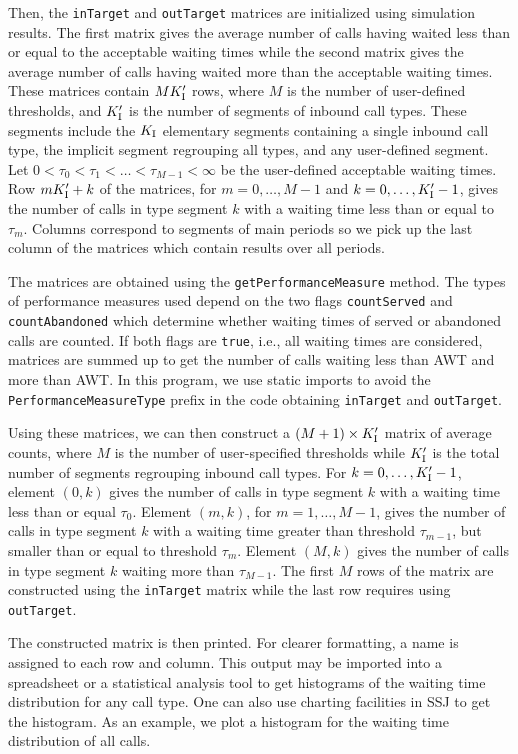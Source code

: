 Then, the \texttt{in\-Target} and \texttt{out\-Target} matrices are
initialized using simulation results.
The first matrix gives the average number of calls having waited less
than or equal to the acceptable waiting times while the
second matrix gives the average number of calls having waited
more than the acceptable waiting times.
These matrices contain $MK_{\mathrm{I}}'$ rows, where $M$ is the number of
user-defined
thresholds, and $K_{\mathrm{I}}'$ is the number of segments of inbound call
types.
These segments include the $K_{\mathrm{I}}$ elementary segments containing a
single inbound call type,
the implicit segment regrouping all types, and any
user-defined segment.
Let $0<\tau_0<\tau_1<\ldots<\tau_{M-1}<\infty$ be the
user-defined acceptable waiting times.
Row $mK_{\mathrm{I}}' + k$ of the matrices,
for $m=0,\ldots,M-1$ and $k=0,\ldots,K_{\mathrm{I}}'-1$,
gives the number of calls
in type segment $k$ with a waiting time less than or equal to
$\tau_m$.
Columns correspond to segments of main periods
so we pick up the last column of the matrices which contain
results over all periods.

The matrices are obtained using
the \texttt{get\-Performance\-Measure} method.
The types of performance measures used
depend on
the two flags
\texttt{count\-Served} and \texttt{count\-Abandoned} which
determine whether waiting times of served or abandoned calls
are counted.
If both flags are \texttt{true}, i.e., all waiting times are
considered,
matrices are summed up to get the number of calls waiting less than
AWT and more than AWT.
In this program, we use static imports to avoid the
\texttt{Performance\-Measure\-Type} prefix in the code obtaining
\texttt{in\-Target} and \texttt{out\-Target}.

Using these matrices, we can then construct a
$(M+1)\times K_{\mathrm{I}}'$ matrix of average counts, where $M$
is the number of user-specified thresholds while
$K_{\mathrm{I}}'$ is the total number of segments regrouping inbound call types.
For $k=0,\ldots,K_{\mathrm{I}}'-1$,
element $(0, k)$ gives the number of calls
in type segment $k$ with a waiting time less than or equal $\tau_0$.
Element $(m, k)$, for $m=1,\ldots,M-1$,
gives the number of calls in type segment
$k$ with a waiting time greater than threshold
$\tau_{m-1}$, but smaller than or equal to threshold $\tau_m$.
Element $(M,k)$ gives the number of calls in type segment $k$
waiting more than $\tau_{M-1}$.
The first $M$ rows of the matrix are constructed using the
\texttt{in\-Target} matrix while the last
row requires using \texttt{out\-Target}.

The constructed matrix is then printed.
For clearer formatting, a name is assigned to each row and column.
This output may be imported into a spreadsheet or a statistical
analysis tool to get histograms of the waiting time distribution for
any call type.
One can also use charting facilities in SSJ to get the histogram.
As an example, we plot a histogram for the waiting time distribution
of all calls.

